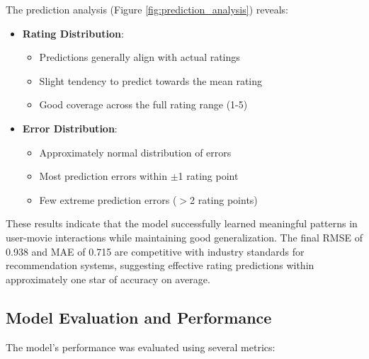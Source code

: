 \documentclass[12pt]{article}
\begin{document}
The prediction analysis (Figure \ref{fig:prediction_analysis}) reveals:
\begin{itemize}
    \item \textbf{Rating Distribution}:
    \begin{itemize}
        \item Predictions generally align with actual ratings
        \item Slight tendency to predict towards the mean rating
        \item Good coverage across the full rating range (1-5)
    \end{itemize}
    
    \item \textbf{Error Distribution}:
    \begin{itemize}
        \item Approximately normal distribution of errors
        \item Most prediction errors within $\pm$1 rating point
        \item Few extreme prediction errors ($>$2 rating points)
    \end{itemize}
\end{itemize}

These results indicate that the model successfully learned meaningful patterns in user-movie interactions while maintaining good generalization. The final RMSE of 0.938 and MAE of 0.715 are competitive with industry standards for recommendation systems, suggesting effective rating predictions within approximately one star of accuracy on average.

\subsection{Model Evaluation and Performance}
The model's performance was evaluated using several metrics:
\end{document}
